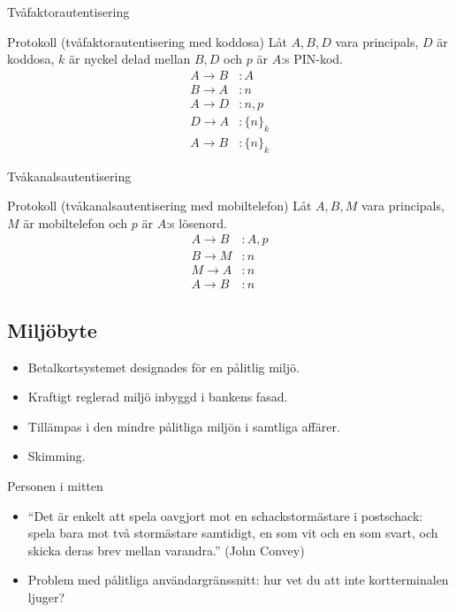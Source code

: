 \documentclass{beamer}
\theoremstyle{definition}
\theoremstyle{remark}
\newcommand{\encrypt}[2]{\{#1\}_{#2}}
\begin{document}
\begin{frame}{Tvåfaktorautentisering}
  \begin{block}{Protokoll (tvåfaktorautentisering med koddosa)}
    Låt \(A, B, D\) vara principals, \(D\) är koddosa, \(k\) är nyckel delad 
    mellan \(B, D\) och \(p\) är \(A\):s PIN-kod.
    \begin{align*}
      A\to B &\colon A \\
      B\to A &\colon n \\
      A\to D &\colon n, p \\
      D\to A &\colon \encrypt{n}{k} \\
      A\to B &\colon \encrypt{n}{k}
    \end{align*}
  \end{block}
\end{frame}

\begin{frame}{Tvåkanalsautentisering}
  \begin{block}{Protokoll (tvåkanalsautentisering med mobiltelefon)}
    Låt \(A, B, M\) vara principals, \(M\) är mobiltelefon och \(p\) är \(A\):s 
    lösenord.
    \begin{align*}
      A\to B &\colon A, p \\
      B\to M &\colon n \\
      M\to A &\colon n \\
      A\to B &\colon n
    \end{align*}
  \end{block}
\end{frame}

\subsection{Miljöbyte}

\begin{frame}
  \begin{itemize}
    \item Betalkortsystemet designades för en pålitlig miljö.
    \item Kraftigt reglerad miljö inbyggd i bankens fasad.
    \item Tillämpas i den mindre pålitliga miljön i samtliga affärer.
    \item Skimming.
  \end{itemize}
\end{frame}

\begin{frame}{Personen i mitten}
  \begin{itemize}
    \item \enquote{Det är enkelt att spela oavgjort mot en schackstormästare 
        i postschack: spela bara mot två stormästare samtidigt, en som vit och 
        en som svart, och skicka deras brev mellan varandra.} (John Convey)
    \item Problem med pålitliga användargränssnitt: hur vet du att inte 
      kortterminalen ljuger?
  \end{itemize}
\end{frame}
\end{document}
